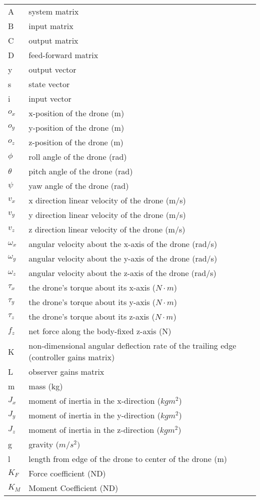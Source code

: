 {\renewcommand\arraystretch{1.0}
\noindent\begin{longtable*}{@{}l @{\quad=\quad} l@{}}
A & system matrix\\
B & input matrix\\
C & output matrix\\
D & feed-forward matrix\\
y & output vector\\
s & state vector\\ 
i & input vector\\
$o_x$ & x-position of the drone (m)\\
$o_y$ & y-position of the drone (m)\\
$o_z$ & z-position of the drone (m)\\
$\phi$ & roll angle of the drone (rad)\\
$\theta$ & pitch angle of the drone (rad)\\
$\psi$ & yaw angle of the drone (rad)\\
$v_x$ & x direction linear velocity of the drone (m/s)\\
$v_y$ & y direction linear velocity of the drone (m/s)\\
$v_z$ & z direction linear velocity of the drone (m/s)\\
$\omega_x$ & angular velocity about the x-axis of the drone (rad/s)\\
$\omega_y$ &  angular velocity about the y-axis of the drone (rad/s)\\
$\omega_z$ & angular velocity about the z-axis of the drone (rad/s)\\
$\tau_x$ & the drone's torque about its x-axis ($N \cdot m$)\\
$\tau_y$ & the drone's torque about its y-axis ($N \cdot m$)\\
$\tau_z$ & the drone's torque about its z-axis ($N \cdot m$) \\
$f_z$ & net force along the body-fixed z-axis (N)\\
K & non-dimensional angular deflection rate of the trailing edge (controller gains matrix)\\
L & observer gains matrix\\
m & mass (kg)\\
$J_x$ & moment of inertia in the x-direction ($kg m^2$)\\
$J_y$ & moment of inertia in the y-direction ($kg m^2$)\\
$J_z$ & moment of inertia in the z-direction ($kg m^2$)\\
g & gravity ($m/s^2)$\\
l & length from edge of the drone to center of the drone (m)\\
$K_F$ & Force coefficient (ND)\\
$K_M$ & Moment Coefficient (ND)\\
\end{longtable*}}